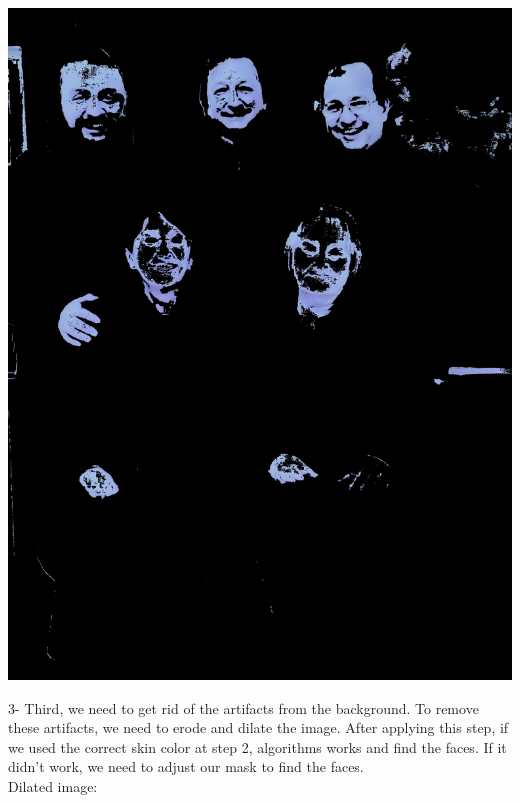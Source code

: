 \documentclass[conference]{IEEEtran}
\begin{document}
\includegraphics[scale=0.05]{mask.jpg}

3- Third, we need to get rid of the artifacts from the background. To remove these artifacts, we need to erode and dilate the image. After applying this step, if we used the correct skin color at step 2, algorithms works and find the faces. If it didn't work, we need to adjust our mask to find the faces. \\

Dilated image: \\
\end{document}
